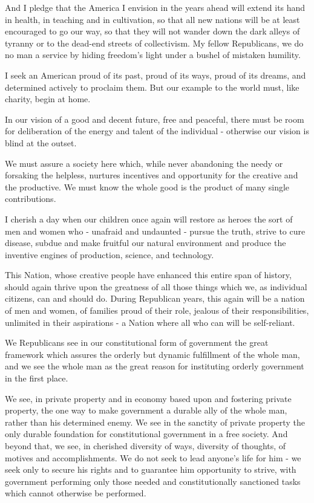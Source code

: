 \documentclass{article}
\begin{document}
And I pledge that the America I envision in the years ahead will extend its
hand in health, in teaching and in cultivation, so that all new nations will be
at least encouraged to go our way, so that they will not wander down the dark
alleys of tyranny or to the dead-end streets of collectivism. My fellow
Republicans, we do no man a service by hiding freedom's light under a bushel of
mistaken humility.

I seek an American proud of its past, proud of its ways, proud of its dreams,
and determined actively to proclaim them. But our example to the world must,
like charity, begin at home.

In our vision of a good and decent future, free and peaceful, there must be
room for deliberation of the energy and talent of the individual - otherwise
our vision is blind at the outset.

We must assure a society here which, while never abandoning the needy or
forsaking the helpless, nurtures incentives and opportunity for the creative
and the productive. We must know the whole good is the product of many single
contributions.

I cherish a day when our children once again will restore as heroes the sort of
men and women who - unafraid and undaunted - pursue the truth, strive to cure
disease, subdue and make fruitful our natural environment and produce the
inventive engines of production, science, and technology.

This Nation, whose creative people have enhanced this entire span of history,
should again thrive upon the greatness of all those things which we, as
individual citizens, can and should do. During Republican years, this again
will be a nation of men and women, of families proud of their role, jealous of
their responsibilities, unlimited in their aspirations - a Nation where all who
can will be self-reliant.

We Republicans see in our constitutional form of government the great framework
which assures the orderly but dynamic fulfillment of the whole man, and we see
the whole man as the great reason for instituting orderly government in the
first place.

We see, in private property and in economy based upon and fostering private
property, the one way to make government a durable ally of the whole man,
rather than his determined enemy. We see in the sanctity of private property
the only durable foundation for constitutional government in a free society.
And beyond that, we see, in cherished diversity of ways, diversity of thoughts,
of motives and accomplishments. We do not seek to lead anyone's life for him -
we seek only to secure his rights and to guarantee him opportunity to strive,
with government performing only those needed and constitutionally sanctioned
tasks which cannot otherwise be performed.
\end{document}
